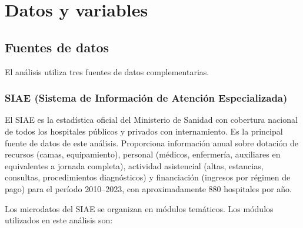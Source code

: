 ﻿\chapter{Datos y variables}
\label{ch:datos}

\section{Fuentes de datos}

El análisis utiliza tres fuentes de datos complementarias.

\subsection{SIAE (Sistema de Información de Atención Especializada)}

El SIAE es la estadística oficial del Ministerio de Sanidad con cobertura nacional de todos los hospitales públicos y privados con internamiento. Es la principal fuente de datos de este análisis. Proporciona información anual sobre dotación de recursos (camas, equipamiento), personal (médicos, enfermería, auxiliares en equivalentes a jornada completa), actividad asistencial (altas, estancias, consultas, procedimientos diagnósticos) y financiación (ingresos por régimen de pago) para el período 2010--2023, con aproximadamente 880 hospitales por año.

Los microdatos del SIAE se organizan en módulos temáticos. Los módulos utilizados en este análisis son:

